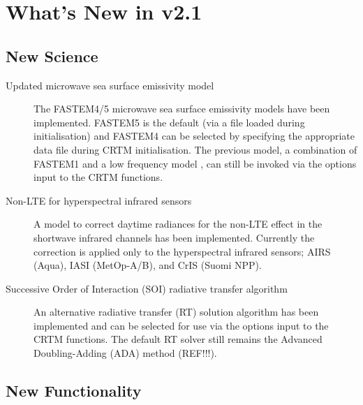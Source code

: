 \chapter*{What's New in v2.1}

\section*{New Science}

\begin{description}
\item[Updated microwave sea surface emissivity model] The FASTEM4/5 microwave sea surface emissivity models have been implemented. FASTEM5 is the default (via a file loaded during initialisation) and FASTEM4 \citep{QLiu_2011} can be selected by specifying the appropriate data file during CRTM initialisation. The previous model, a combination of FASTEM1 \citep{Fastem1} and a low frequency model \citep{Kazumori_2008}, can still be invoked via the options input to the CRTM functions.

\item[Non-LTE for hyperspectral infrared sensors] A model to correct daytime radiances for the non-LTE effect in the shortwave infrared channels has been implemented. Currently the correction is applied only to the hyperspectral infrared sensors; AIRS (Aqua), IASI (MetOp-A/B), and CrIS (Suomi NPP).

\item[Successive Order of Interaction (SOI) radiative transfer algorithm] An alternative radiative transfer (RT) solution algorithm \citep{SOI_1} has been implemented and can be selected for use via the options input to the CRTM functions. The default RT solver still remains the Advanced Doubling-Adding (ADA) method (REF!!!).

\end{description}


\section*{New Functionality}

